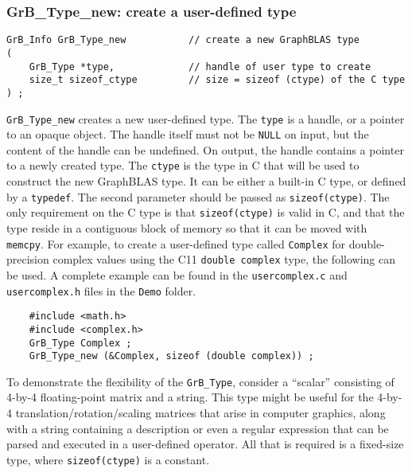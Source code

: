 \documentclass[12pt]{article}
\begin{document}
\subsubsection{{\sf GrB\_Type\_new:} create a user-defined type}
\label{type_new}

\begin{mdframed}[userdefinedwidth=6in]
{\footnotesize
\begin{verbatim}
GrB_Info GrB_Type_new           // create a new GraphBLAS type
(
    GrB_Type *type,             // handle of user type to create
    size_t sizeof_ctype         // size = sizeof (ctype) of the C type
) ;
\end{verbatim}
}\end{mdframed}

\verb'GrB_Type_new' creates a new user-defined type.  The \verb'type' is a
handle, or a pointer to an opaque object.  The handle itself must not be
\verb'NULL' on input, but the content of the handle can be undefined.  On
output, the handle contains a pointer to a newly created type.
The \verb'ctype' is the type in C that will be used to construct the new
GraphBLAS type.  It can be either a built-in C type, or defined by a
\verb'typedef'.
The second parameter should be passed as \verb'sizeof(ctype)'.  The only
requirement on the C type is that \verb'sizeof(ctype)' is valid in C, and
that the type reside in a contiguous block of memory so that it can be moved
with \verb'memcpy'.  For example, to create a user-defined type called
\verb'Complex' for double-precision complex values using the C11
\verb'double complex' type, the following can be used.  A complete example can
be found in the \verb'usercomplex.c' and \verb'usercomplex.h' files in the
\verb'Demo' folder.

    {\footnotesize
    \begin{verbatim}
    #include <math.h>
    #include <complex.h>
    GrB_Type Complex ;
    GrB_Type_new (&Complex, sizeof (double complex)) ;    \end{verbatim} }

To demonstrate the flexibility of the \verb'GrB_Type', consider a ``scalar''
consisting of 4-by-4 floating-point matrix and a string.  This type might be
useful for the 4-by-4 translation/rotation/scaling matrices that arise in
computer graphics, along with a string containing a description or even a
regular expression that can be parsed and executed in a user-defined operator.
All that is required is a fixed-size type, where \verb'sizeof(ctype)' is
a constant.
\end{document}
